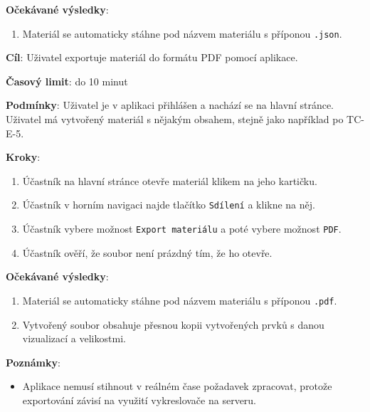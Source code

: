 \textbf{Očekávané výsledky}:

\begin{enumerate}[leftmargin=1.4cm]
    \item Materiál se automaticky stáhne pod názvem materiálu s příponou \verb|.json|.
\end{enumerate}




\vspace{1em}

\textbf{Cíl}: Uživatel exportuje materiál do formátu PDF pomocí aplikace.

\textbf{Časový limit}: do 10 minut

\textbf{Podmínky}:  Uživatel je v aplikaci přihlášen a nachází se na hlavní stránce. Uživatel má vytvořený materiál s nějakým obsahem, stejně jako například po TC-E-5.

\textbf{Kroky}:

\begin{enumerate}[leftmargin=1.4cm]
    \item Účastník na hlavní stránce otevře materiál klikem na jeho kartičku.
    \item Účastník v horním navigaci najde tlačítko \verb|Sdílení| a klikne na něj.
    \item Účastník vybere možnost \verb|Export materiálu| a poté vybere možnost \verb|PDF|.
    \item Účastník ověří, že soubor není prázdný tím, že ho otevře.
\end{enumerate}

\textbf{Očekávané výsledky}:

\begin{enumerate}[leftmargin=1.4cm]
    \item Materiál se automaticky stáhne pod názvem materiálu s příponou \verb|.pdf|.
    \item Vytvořený soubor obsahuje přesnou kopii vytvořených prvků s danou vizualizací a velikostmi.
\end{enumerate}

\textbf{Poznámky}:

\begin{itemize}[leftmargin=1.4cm]
    \item Aplikace nemusí stihnout v reálném čase požadavek zpracovat, protože exportování závisí na využití vykreslovače na serveru.
\end{itemize}





